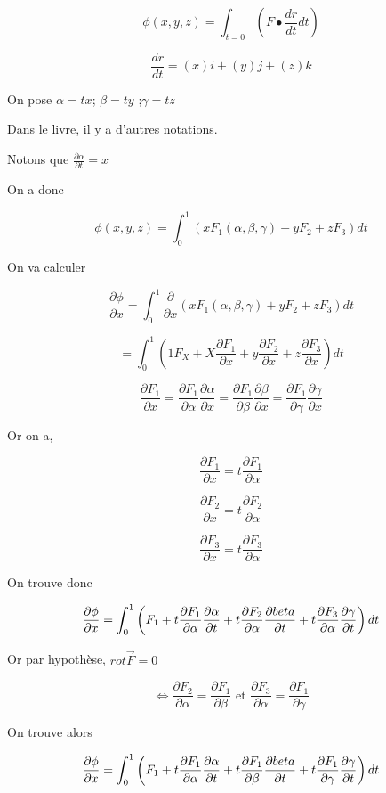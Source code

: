 \[\phi(x,y,z) = \int _{t=0} \left( F\bullet \frac{dr}{dt} dt \right) \]

\[\frac{dr}{dt} = (x) i +(y)j +(z) k\]

On pose $\alpha = tx$; $\beta = ty $ ;$\gamma = tz$

Dans le livre, il y a d'autres notations.

Notons que $\frac{\partial \alpha}{\partial t} = x$

On a donc

\[\phi (x,y,z) = \int_0^1 \left( x F_1 (\alpha, \beta, \gamma ) + y F_2 + z F_3 \right) dt \]

On va calculer

\[\frac{\partial \phi}{\partial x} = \int_0^1 \frac{\partial}{\partial x} \left( x F_1 (\alpha, \beta, \gamma ) + y F_2 + z F_3 \right) dt\]

\[= \int_0^1 \left( 1F_X +X \frac{\partial F_1}{\partial x} + y \frac{\partial F_2}{\partial x} + z \frac{\partial F_3}{\partial x} \right) dt\]


\[
\frac{\partial F_1}{\partial x} = \frac{\partial F_1}{\partial \alpha} \frac{\partial \alpha}{\partial x}
=\frac{\partial F_1}{\partial \beta} \frac{\partial \beta}{\partial x}
=\frac{\partial F_1}{\partial \gamma} \frac{\partial \gamma}{\partial x}
\]

Or on a,

\[\frac{\partial F_1}{\partial x} = t \frac{\partial F_1}{\partial \alpha}\]

\[\frac{\partial F_2}{\partial x} = t \frac{\partial F_2}{\partial \alpha}\]

\[\frac{\partial F_3}{\partial x} = t \frac{\partial F_3}{\partial \alpha}\]

On trouve donc

\[\frac{\partial \phi}{\partial x}=\int_0^1 \left( F_1+t \frac{\partial F_1}{\partial \alpha} \frac{\partial \alpha}{\partial t}
+t \frac{\partial F_2}{\partial \alpha} \frac{\partial \\beta}{\partial t}
+t \frac{\partial F_3}{\partial \alpha} \frac{\partial \gamma}{\partial t}
\right) dt
\]

Or par hypothèse, $rot \vec F = 0$

\[\Leftrightarrow  \frac{\partial F_2}{\partial \alpha} = \frac{\partial F_1}{\partial \beta} \text{ et }  \frac{\partial F_3}{\partial \alpha} = \frac{\partial F_1}{\partial \gamma} \]

On trouve alors

\[
\frac{\partial \phi}{\partial x}=\int_0^1 \left( F_1 +t \frac{\partial F_1}{\partial \alpha} \frac{\partial \alpha}{\partial t}
+t \frac{\partial F_1}{\partial \beta} \frac{\partial \\beta}{\partial t}
+t \frac{\partial F_1}{\partial \gamma} \frac{\partial \gamma}{\partial t}
\right) dt
\]

